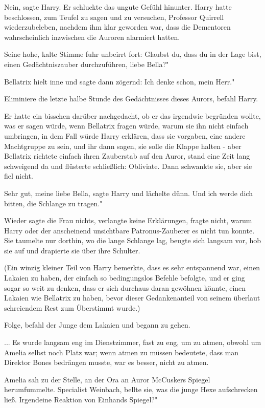 \glqq Nein\grqq{}, sagte Harry. Er schluckte das ungute Gefühl hinunter. Harry
hatte beschlossen, zum Teufel zu sagen und zu versuchen, Professor Quirrell
wiederzubeleben, nachdem ihm klar geworden war, dass die Dementoren
wahrscheinlich inzwischen die Auroren alarmiert hatten.

Seine hohe, kalte Stimme fuhr unbeirrt fort: \glqq Glaubst du, dass du in der
Lage bist, einen Gedächtniszauber durchzuführen, liebe Bella?"

Bellatrix hielt inne und sagte dann zögernd: \glqq Ich denke schon, mein Herr."

\glqq Eliminiere die letzte halbe Stunde des Gedächtnisses dieses Aurors\grqq{},
befahl Harry.

Er hatte ein bisschen darüber nachgedacht, ob er das irgendwie begründen wollte,
was er sagen würde, wenn Bellatrix fragen würde, warum sie ihn nicht einfach
umbringen, in dem Fall würde Harry erklären, dass sie vorgaben, eine andere
Machtgruppe zu sein, und ihr dann sagen, sie solle die Klappe halten - aber
Bellatrix richtete einfach ihren Zauberstab auf den Auror, stand eine Zeit lang
schweigend da und flüsterte schließlich: \glqq Obliviate.\grqq{} Dann schwankte
sie, aber sie fiel nicht.

\glqq Sehr gut, meine liebe Bella\grqq{}, sagte Harry und lächelte dünn. \glqq
Und ich werde dich bitten, die Schlange zu tragen."

Wieder sagte die Frau nichts, verlangte keine Erklärungen, fragte nicht, warum
Harry oder der anscheinend unsichtbare Patronus-Zauberer es nicht tun konnte.
Sie taumelte nur dorthin, wo die lange Schlange lag, beugte sich langsam vor,
hob sie auf und drapierte sie über ihre Schulter.

(Ein winzig kleiner Teil von Harry bemerkte, dass es sehr entspannend war, einen
Lakaien zu haben, der einfach so bedingungslos Befehle befolgte, und er ging
sogar so weit zu denken, dass er sich durchaus daran gewöhnen könnte, einen
Lakaien wie Bellatrix zu haben, bevor dieser Gedankenanteil von seinem überlaut
schreiendem Rest zum Überstimmt wurde.)

\glqq Folge\grqq{}, befahl der Junge dem Lakaien und begann zu gehen.


... Es wurde langsam eng im Dienstzimmer, fast zu eng, um zu atmen, obwohl um
Amelia selbst noch Platz war; wenn atmen zu müssen bedeutete, dass man Direktor
Bones bedrängen musste, war es besser, nicht zu atmen.

Amelia sah zu der Stelle, an der Ora an Auror McCuskers Spiegel herumfummelte.
\glqq Specialist Weinbach\grqq{}, bellte sie, was die junge Hexe aufschrecken
ließ. \glqq Irgendeine Reaktion von Einhands Spiegel?"

